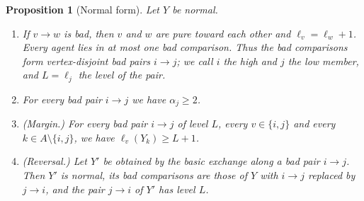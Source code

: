\documentclass{amsart}
\numberwithin{equation}{section}
\newtheorem{proposition}[theorem]{Proposition}
\theoremstyle{definition}
\theoremstyle{remark}
\begin{document}
\begin{proposition}[Normal form]\label{prop:normal}
Let $Y$ be normal.
\begin{enumerate}[label=\textup{(\alph*)}]
\item If $v\to w$ is bad, then $v$ and $w$ are pure toward each other and $\ell_v=\ell_w+1$. Every agent lies in at most one bad comparison. Thus the bad comparisons form vertex-disjoint \emph{bad pairs} $i\to j$; we call $i$ the \emph{high} and $j$ the \emph{low} member, and $L=\ell_j$ the \emph{level} of the pair.
\item For every bad pair $i\to j$ we have $\alpha_j\ge 2$.
\item \textup{(Margin.)} For every bad pair $i\to j$ of level $L$, every $v\in\{i,j\}$ and every $k\in A\setminus\{i,j\}$, we have $\ell_v(Y_k)\ge L+1$.
\item \textup{(Reversal.)} Let $Y'$ be obtained by the basic exchange along a bad pair $i\to j$. Then $Y'$ is normal, its bad comparisons are those of $Y$ with $i\to j$ replaced by $j\to i$, and the pair $j\to i$ of $Y'$ has level $L$.
\end{enumerate}
\end{proposition}
\end{document}
